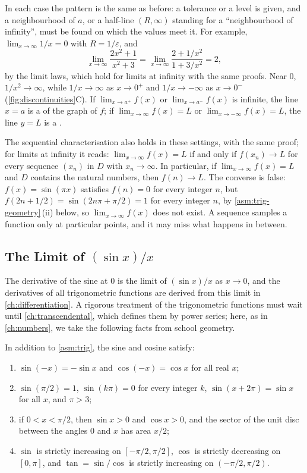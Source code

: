 In each case the pattern is the same as before: a tolerance or a level is given, and a neighbourhood of $a$, or a half-line $(R,\infty)$ standing for a ``neighbourhood of infinity'', must be found on which the values meet it. For example, $\lim_{x\to\infty}1/x=0$ with $R=1/\varepsilon$, and
\[
\lim_{x\to\infty}\frac{2x^2+1}{x^2+3}=\lim_{x\to\infty}\frac{2+1/x^2}{1+3/x^2}=2 ,
\]
by the limit laws, which hold for limits at infinity with the same proofs. Near $0$, $1/x^2\to\infty$, while $1/x\to\infty$ as $x\to0^+$ and $1/x\to-\infty$ as $x\to0^-$ (\cref{fig:discontinuities}C). If $\lim_{x\to a^+}f(x)$ or $\lim_{x\to a^-}f(x)$ is infinite, the line $x=a$ is a  of the graph of $f$; if $\lim_{x\to\infty}f(x)=L$ or $\lim_{x\to-\infty}f(x)=L$, the line $y=L$ is a .

The sequential characterisation also holds in these settings, with the same proof; for limits at infinity it reads: $\lim_{x\to\infty}f(x)=L$ if and only if $f(x_n)\to L$ for every sequence $(x_n)$ in $D$ with $x_n\to\infty$. In particular, if $\lim_{x\to\infty}f(x)=L$ and $D$ contains the natural numbers, then $f(n)\to L$. The converse is false: $f(x)=\sin(\pi x)$ satisfies $f(n)=0$ for every integer $n$, but $f(2n+1/2)=\sin(2n\pi+\pi/2)=1$ for every integer $n$, by \cref{asm:trig-geometry}\,(ii) below, so $\lim_{x\to\infty}f(x)$ does not exist. A sequence samples a function only at particular points, and it may miss what happens in between.

\subsection{The Limit of \texorpdfstring{$(\sin x)/x$}{sin(x)/x}}

The derivative of the sine at $0$ is the limit of $(\sin x)/x$ as $x\to0$, and the derivatives of all trigonometric functions are derived from this limit in \cref{ch:differentiation}. A rigorous treatment of the trigonometric functions must wait until \cref{ch:transcendental}, which defines them by power series; here, as in \cref{ch:numbers}, we take the following facts from school geometry.

\begin{assumption}
\label{asm:trig-geometry}
In addition to \cref{asm:trig}, the sine and cosine satisfy:
\begin{enumerate}
\item $\sin(-x)=-\sin x$ and $\cos(-x)=\cos x$ for all real $x$;
\item $\sin(\pi/2)=1$, $\sin(k\pi)=0$ for every integer $k$, $\sin(x+2\pi)=\sin x$ for all $x$, and $\pi>3$;
\item if $0<x<\pi/2$, then $\sin x>0$ and $\cos x>0$, and the sector of the unit disc between the angles $0$ and $x$ has area $x/2$;
\item $\sin$ is strictly increasing on $[-\pi/2,\pi/2]$, $\cos$ is strictly decreasing on $[0,\pi]$, and $\tan=\sin/\cos$ is strictly increasing on $(-\pi/2,\pi/2)$.
\end{enumerate}
\end{assumption}


